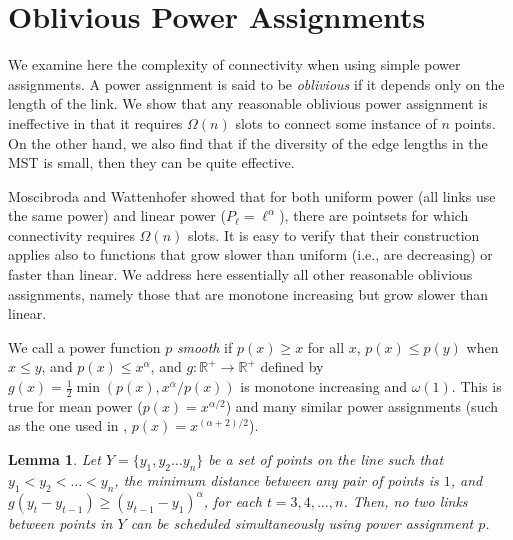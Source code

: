 \documentclass[11pt]{amsart}
\newcounter{foo}
\newtheorem{lemma}[foo]{Lemma}
\begin{document}
\section{Oblivious Power Assignments}
\label{sec:oblivious}


We examine here the complexity of connectivity when using simple power
assignments. A power assignment is said
to be \emph{oblivious} if it depends only on the length of the link.
We show that any reasonable oblivious power assignment is ineffective
in that it requires $\Omega(n)$ slots to connect some instance of $n$ points.
On the other hand, we also find that if the diversity of the edge lengths in the MST is
small, then they can be quite effective. 



Moscibroda and Wattenhofer \cite{MoWa06} showed that for both uniform power (all links use the same power)
and linear power ($P_{\ell} = \ell^{\alpha}$), there are pointsets for which connectivity requires
$\Omega(n)$ slots.  It is easy to verify that their construction
applies also to functions that grow slower than uniform (i.e., are decreasing)
or faster than linear.
We address here essentially all other reasonable
oblivious assignments, namely those that are monotone increasing but
grow slower than linear.  

We call a power function $p$ 
\emph{smooth} if $p(x) \geq x$ for all $x$, $p(x) \le p(y)$ when $x \le y$, and $p(x) \le x^\alpha$,
and $g:\mathbb{R}^+ \rightarrow
\mathbb{R}^+$  defined by $g(x) = \frac{1}{2}\min(p(x),
x^{\alpha}/p(x))$ is monotone
increasing and $\omega(1)$. This is true for mean power ($p(x) = x^{\alpha/2}$) and many similar power assignments (such as the
one used in \cite{DBLP:conf/wdag/KowalskiR10}, $p(x) = x^{(\alpha+2)/2}$).

\begin{lemma}
Let $Y = \{y_1, y_2 \ldots y_n\}$ be a set of points on the line such that $y_1 < y_2 < \ldots < y_n$, 
the minimum distance between any pair of points is $1$, and 
$g(y_t - y_{t-1}) \geq  (y_{t-1} - y_1)^\alpha$, for each $t=3, 4, \ldots, n$. 
Then, no two links between points in $Y$ can be scheduled simultaneously using power assignment $p$.
\label{lem:incr1}
\end{lemma} 
\end{document}
